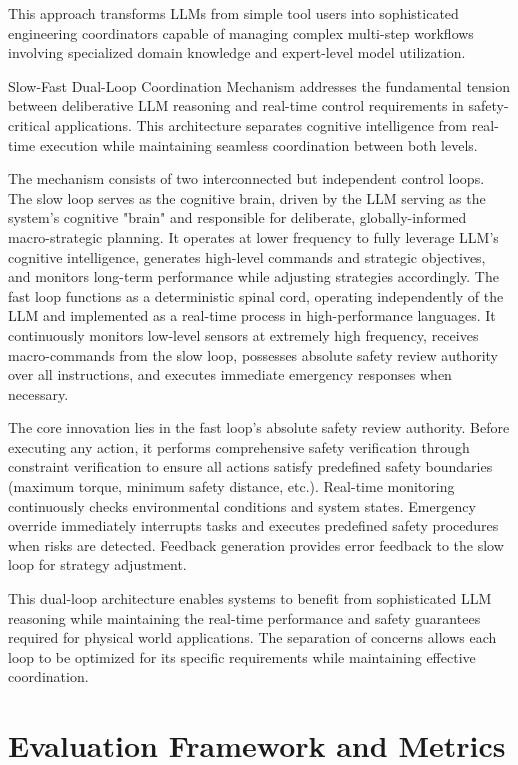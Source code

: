 This approach transforms LLMs from simple tool users into sophisticated engineering coordinators capable of managing complex multi-step workflows involving specialized domain knowledge and expert-level model utilization.

Slow-Fast Dual-Loop Coordination Mechanism addresses the fundamental tension between deliberative LLM reasoning and real-time control requirements in safety-critical applications. This architecture separates cognitive intelligence from real-time execution while maintaining seamless coordination between both levels.

The mechanism consists of two interconnected but independent control loops. The slow loop serves as the cognitive brain, driven by the LLM serving as the system's cognitive "brain" and responsible for deliberate, globally-informed macro-strategic planning. It operates at lower frequency to fully leverage LLM's cognitive intelligence, generates high-level commands and strategic objectives, and monitors long-term performance while adjusting strategies accordingly. The fast loop functions as a deterministic spinal cord, operating independently of the LLM and implemented as a real-time process in high-performance languages. It continuously monitors low-level sensors at extremely high frequency, receives macro-commands from the slow loop, possesses absolute safety review authority over all instructions, and executes immediate emergency responses when necessary.

The core innovation lies in the fast loop's absolute safety review authority. Before executing any action, it performs comprehensive safety verification through constraint verification to ensure all actions satisfy predefined safety boundaries (maximum torque, minimum safety distance, etc.). Real-time monitoring continuously checks environmental conditions and system states. Emergency override immediately interrupts tasks and executes predefined safety procedures when risks are detected. Feedback generation provides error feedback to the slow loop for strategy adjustment.

This dual-loop architecture enables systems to benefit from sophisticated LLM reasoning while maintaining the real-time performance and safety guarantees required for physical world applications. The separation of concerns allows each loop to be optimized for its specific requirements while maintaining effective coordination.

\section{Evaluation Framework and Metrics}

